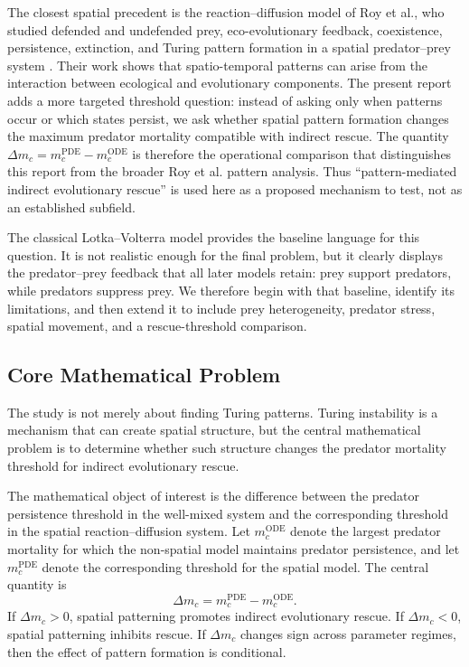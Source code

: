 \documentclass[12pt,letterpaper]{article}
\numberwithin{equation}{section}
\begin{document}
The closest spatial precedent is the reaction--diffusion model of Roy et al., who
studied defended and undefended prey, eco-evolutionary feedback, coexistence,
persistence, extinction, and Turing pattern formation in a spatial predator--prey system
\cite{roy2026}. Their work shows that spatio-temporal patterns can arise from the
interaction between ecological and evolutionary components. The present report adds a
more targeted threshold question: instead of asking only when patterns occur or which
states persist, we ask whether spatial pattern formation changes the maximum predator
mortality compatible with indirect rescue. The quantity
$\Delta m_c=m_c^{\mathrm{PDE}}-m_c^{\mathrm{ODE}}$ is therefore the operational
comparison that distinguishes this report from the broader Roy et al. pattern analysis.
Thus ``pattern-mediated indirect evolutionary rescue'' is used here as a proposed
mechanism to test, not as an established subfield.

The classical Lotka--Volterra model provides the baseline language for this question.
It is not realistic enough for the final problem, but it clearly displays the
predator--prey feedback that all later models retain: prey support predators, while
predators suppress prey. We therefore begin with that baseline, identify its
limitations, and then extend it to include prey heterogeneity, predator stress, spatial
movement, and a rescue-threshold comparison.

\subsection{Core Mathematical Problem}

The study is not merely about finding Turing patterns. Turing instability is a
mechanism that can create spatial structure, but the central mathematical problem is to
determine whether such structure changes the predator mortality threshold for indirect
evolutionary rescue.

The mathematical object of interest is the difference between the predator persistence
threshold in the well-mixed system and the corresponding threshold in the spatial
reaction--diffusion system. Let $m_c^{\mathrm{ODE}}$ denote the largest predator
mortality for which the non-spatial model maintains predator persistence, and let
$m_c^{\mathrm{PDE}}$ denote the corresponding threshold for the spatial model. The
central quantity is
\begin{equation}
    \Delta m_c=m_c^{\mathrm{PDE}}-m_c^{\mathrm{ODE}}.
\end{equation}
If $\Delta m_c>0$, spatial patterning promotes indirect evolutionary rescue. If
$\Delta m_c<0$, spatial patterning inhibits rescue. If $\Delta m_c$ changes sign
across parameter regimes, then the effect of pattern formation is conditional.
\end{document}
